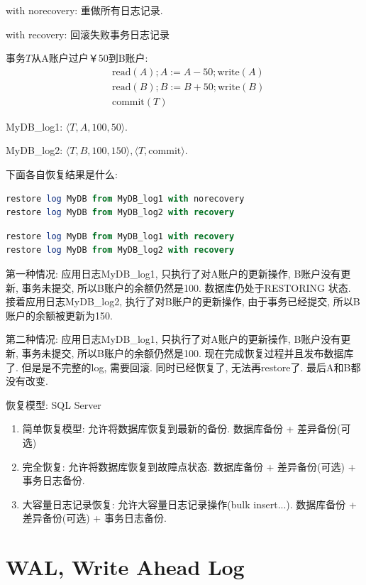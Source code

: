 with norecovery: 重做所有日志记录.

with recovery: 回滚失败事务日志记录

\begin{example}
事务$T$从A账户过户￥50到B账户:
\begin{align*}
    &\text{read}(A); A :=  A - 50; \text{write}(A) \\
    &\text{read}(B); B :=  B + 50; \text{write}(B) \\
    &\text{commit}(T)
\end{align*}

MyDB\_log1: $\langle T, A, 100, 50 \rangle$.

MyDB\_log2: $\langle T, B, 100, 150 \rangle, \langle T, \text{commit} \rangle$.

下面各自恢复结果是什么:
\begin{lstlisting}[language=SQL]
restore log MyDB from MyDB_log1 with norecovery
restore log MyDB from MyDB_log2 with recovery
\end{lstlisting}

\begin{lstlisting}[language=SQL]
restore log MyDB from MyDB_log1 with recovery
restore log MyDB from MyDB_log2 with recovery
\end{lstlisting}
\end{example}

第一种情况: 应用日志MyDB\_log1, 只执行了对A账户的更新操作, B账户没有更新, 事务未提交, 所以B账户的余额仍然是100. 数据库仍处于RESTORING 状态. 接着应用日志MyDB\_log2, 执行了对B账户的更新操作, 由于事务已经提交, 所以B账户的余额被更新为150.

第二种情况: 应用日志MyDB\_log1, 只执行了对A账户的更新操作, B账户没有更新, 事务未提交, 所以B账户的余额仍然是100. 现在完成恢复过程并且发布数据库了. 但是是不完整的log, 需要回滚. 同时已经恢复了, 无法再restore了. 最后A和B都没有改变.

恢复模型: SQL Server
\begin{enumerate}
    \item 简单恢复模型: 允许将数据库恢复到最新的备份. 数据库备份 + 差异备份(可选)
    \item 完全恢复: 允许将数据库恢复到故障点状态. 数据库备份 + 差异备份(可选) + 事务日志备份.
    \item 大容量日志记录恢复: 允许大容量日志记录操作(bulk insert...). 数据库备份 + 差异备份(可选) + 事务日志备份.
\end{enumerate}

\section{WAL, Write Ahead Log}

